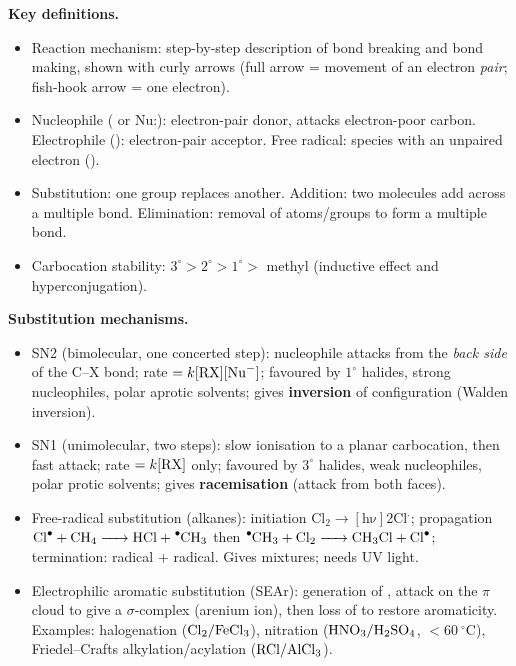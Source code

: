 \documentclass[11pt]{article}
\newcommand{\cle}[1]{{\popxbold\color{popdark}#1}}
\begin{document}
\begin{bilan}

\textbf{Key definitions.}
\begin{itemize}
  \item \cle{Reaction mechanism}: step-by-step description of bond breaking and bond making, shown with \cle{curly arrows} (full arrow = movement of an electron \emph{pair}; fish-hook arrow = one electron).
  \item \cle{Nucleophile} ( or Nu:): electron-pair donor, attacks electron-poor carbon. \cle{Electrophile} (): electron-pair acceptor. \cle{Free radical}: species with an unpaired electron ().
  \item \cle{Substitution}: one group replaces another. \cle{Addition}: two molecules add across a multiple bond. \cle{Elimination}: removal of atoms/groups to form a multiple bond.
  \item \cle{Carbocation stability}: $3^\circ > 2^\circ > 1^\circ >$ methyl (inductive effect and hyperconjugation).
\end{itemize}

\textbf{Substitution mechanisms.}
\begin{itemize}
  \item \cle{SN2} (bimolecular, one concerted step): nucleophile attacks from the \emph{back side} of the C--X bond; rate $= k[\ce{RX}][\ce{Nu^-}]$; favoured by $1^\circ$ halides, strong nucleophiles, polar aprotic solvents; gives \textbf{inversion} of configuration (Walden inversion).
  \item \cle{SN1} (unimolecular, two steps): slow ionisation to a planar \cle{carbocation}, then fast attack; rate $= k[\ce{RX}]$ only; favoured by $3^\circ$ halides, weak nucleophiles, polar protic solvents; gives \textbf{racemisation} (attack from both faces).
  \item \cle{Free-radical substitution} (alkanes): initiation $\ensuremath{\mathrm{Cl_{2} \rightarrow [h\nu] 2Cl^.}}$; propagation $\ce{Cl^. + CH4 -> HCl + ^.CH3}$ then $\ce{^.CH3 + Cl2 -> CH3Cl + Cl^.}$; termination: radical + radical. Gives mixtures; needs UV light.
  \item \cle{Electrophilic aromatic substitution} (SEAr): generation of , attack on the $\pi$ cloud to give a $\sigma$-complex (arenium ion), then loss of  to restore aromaticity. Examples: halogenation ($\ce{Cl2}/\ce{FeCl3}$), nitration ($\ce{HNO3}/\ce{H2SO4}$, $<\SI{60}{\ensuremath{{}^{\circ}\mathrm{C}}}$), Friedel--Crafts alkylation/acylation ($\ce{RCl}/\ce{AlCl3}$).
\end{itemize}


\end{bilan}
\end{document}
